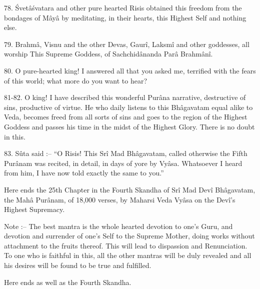 78. \'Svet\^a\'svatara and other pure hearted Risis obtained this freedom from the bondages of M\^ay\^a by meditating, in their hearts, this Highest Self and nothing else.

79. Brahm\^a, Visnu and the other Devas, Gaur\^i, Laksm\^i and other goddesses, all worship This Supreme Goddess, of Sachchid\^ananda Par\^a Brahm\^an\^i.

80. O pure-hearted king! I answered all that you asked me, terrified with the fears of this world; what more do you want to hear?

81-82. O king! I have described this wonderful Pur\^ana narrative, destructive of sins, productive of virtue. He who daily listens to this Bh\^agavatam equal alike to Veda, becomes freed from all sorts of sins and goes to the region of the Highest Goddess and passes his time in the midst of the Highest Glory. There is no doubt in this.

83. Sûta said :-- ``O Risis! This Sr\^i Mad Bh\^agavatam, called otherwise the Fifth Pur\^anam was recited, in detail, in days of yore by Vy\^asa. Whatsoever I heard from him, I have now told exactly the same to you.''

Here ends the 25th Chapter in the Fourth Skandha of Sr\^i Mad Dev\^i Bh\^agavatam, the Mah\^a Pur\^anam, of 18,000 verses, by Maharsi Veda Vy\^asa on the Dev\^i's Highest Supremacy.

Note :-- The best mantra is the whole hearted devotion to one's Guru, and devotion and surrender of one's Self to the Supreme Mother, doing works without attachment to the fruits thereof. This will lead to dispassion and Renunciation. To one who is faithful in this, all the other mantras will be duly revealed and all his desires will be found to be true and fulfilled.

Here ends as well as the Fourth Skandha.